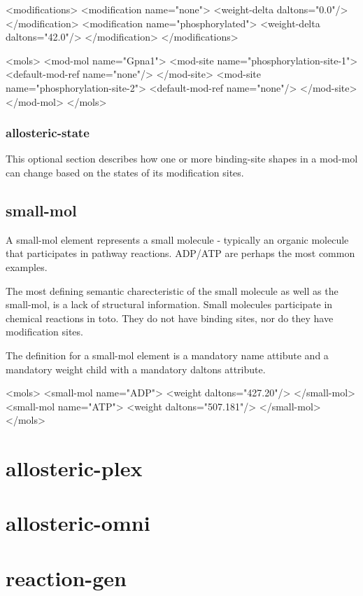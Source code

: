 <modifications>
  <modification name="none">
    <weight-delta daltons="0.0"/>
  </modification>
  <modification name="phosphorylated">
    <weight-delta daltons="42.0"/>
  </modification>
</modifications>

<mols>
  <mod-mol name="Gpna1">
    <mod-site name="phosphorylation-site-1">
      <default-mod-ref name="none"/>
    </mod-site>
    <mod-site name="phosphorylation-site-2">
      <default-mod-ref name="none"/>
    </mod-site>
  </mod-mol>
</mols>


\subsubsection{allosteric-state}
This optional section describes how one or more binding-site shapes in
a mod-mol can change based on the states of its modification sites.

\subsection{small-mol}
A small-mol element represents a small molecule - typically an organic
molecule that participates in pathway reactions.  ADP/ATP are perhaps
the most common examples.

The most defining semantic charecteristic of the small molecule as
well as the small-mol, is a lack of structural information.  Small 
molecules participate in chemical reactions in toto.  They do not have
binding sites, nor do they have modification sites. 

The definition for a small-mol element is a mandatory name attibute
and a mandatory weight child with a mandatory daltons attribute.

<mols>
  <small-mol name="ADP">
    <weight daltons="427.20"/>
  </small-mol>
  <small-mol name="ATP">
    <weight daltons="507.181"/>
  </small-mol>
</mols>

\section{allosteric-plex}

\section{allosteric-omni}

\section{reaction-gen}

